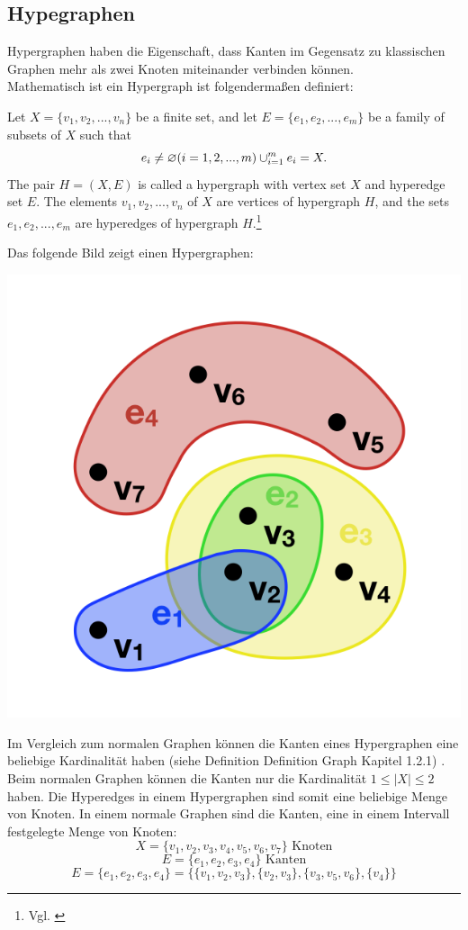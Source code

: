 \subsection{Hypegraphen}
Hypergraphen haben die Eigenschaft, dass Kanten im Gegensatz zu klassischen Graphen mehr als zwei Knoten miteinander verbinden können.
\\Mathematisch ist ein Hypergraph ist folgendermaßen definiert:
\begin{definition}
	Let $X=\{v_{1}, v_{2},...,v_{n}\}$ be a finite set,
	and let $E=\{e_{1},e_{2},...,e_{m}\}$ be a family of subsets of $X$ such that
	\[e_{i} \neq \varnothing (i=1,2,...,m) \\
	\cup_{i=1}^{m}e_{i}=X.
	\]
	The pair $H=(X,E)$ is called a hypergraph with vertex set $X$
	and hyperedge set $E$. The elements $v_{1}, v_{2},...,v_{n}$ of $X$ are vertices
	of hypergraph $H$, and the sets $e_{1}, e_{2},...,e_{m}$ are hyperedges of hypergraph $H$.\footnote{Vgl. \cite[Seite 2]{zhang2018hypergraph}}
\end{definition}
Das folgende Bild zeigt einen Hypergraphen:
\begin{center}
	\includegraphics[scale = 0.5]{./images/Hypergraph2.png}
\end{center}
Im Vergleich zum normalen Graphen können die Kanten eines Hypergraphen eine beliebige Kardinalität haben (siehe Definition Definition Graph Kapitel 1.2.1) . Beim normalen Graphen können die Kanten nur die Kardinalität $1 \leq |X| \leq 2$
haben. Die Hyperedges in einem Hypergraphen sind somit eine beliebige Menge von Knoten. In einem normale Graphen sind die Kanten, eine in einem Intervall festgelegte Menge von Knoten:
    \[X = \{v_{1}, v_{2}, v_{3}, v_{4}, v_{5}, v_{6}, v_{7}\} \text{ Knoten}\]
    \[E=\{e_{1}, e_{2}, e_{3}, e_{4}\} \text{ Kanten}\]
    \[E=\{e_{1}, e_{2}, e_{3}, e_{4}\} = \{\{v_{1}, v_{2}, v_{3}\}, \{v_{2}, v_{3}\}, \{v_{3}, v_{5}, v_{6}\}, \{v_{4}\}\} \]
